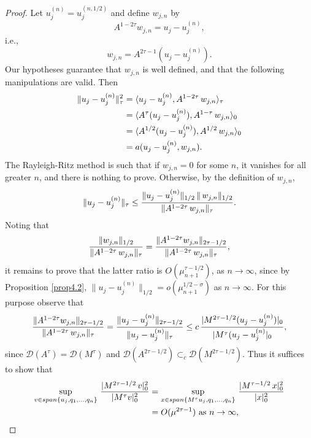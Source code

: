 \documentclass[final]{siamltex}
\numberwithin{equation}{section}
\begin{document}
\begin{proof}
Let $u_{j}^{(n)}= u_{j}^{(n,1/2)}$ and define $w_{j,n}$ by
\[A^{1-2 \tau} w_{j,n} = u_j - u_{j}^{(n)},\]
i.e.,
\[w_{j,n} = A^{2 \tau-1} \left(u_j - u_{j}^{(n)}\right).\]
Our hypotheses guarantee that $w_{j,n}$ is well defined, and that the following manipulations are valid. Then
\begin{align}
\|u_j-u_j^{(n)}\|_{\tau}^2 &= \langle u_j-u_j^{(n)} , A^{1-2 \tau} \, w_{j,n}\rangle_{\tau} \notag \\
&= \langle A^{\tau} (u_j-u_j^{(n)}) , A^{1-\tau} \, w_{j,n}\rangle_{0} \notag \\
&= \langle A^{1/2} (u_j-u_j^{(n)}) , A^{1/2} \, w_{j,n}\rangle_{0}\notag \\
&=a(u_j-u_j^{(n)}, w_{j,n}).\notag
\end{align}
The Rayleigh-Ritz method is such that if $w_{j,n}=0$ for some $n$, it vanishes for all greater $n$, and there is nothing to prove. Otherwise, by the definition of $w_{j,n}$,
\begin{equation} \notag
\|u_j-u_j^{(n)}\|_{\tau} \le \frac{\|u_j-u_j^{(n)}\|_{1/2}\, \|\, w_{j,n}\|_{1/2}}
{\|A^{1-2 \tau} \, w_{j,n}\|_{\tau}}.
\end{equation}
Noting that
\begin{equation} \notag
\frac{\|w_{j,n}\|_{1/2}}
{\|A^{1-2 \tau} \, w_{j,n}\|_{\tau}}= \frac{\|A^{1-2\tau} w_{j,n}\|_{2\tau-1/2}}
{\|A^{1-2 \tau} \, w_{j,n}\|_{\tau}},
\end{equation}
it remains to prove that the latter ratio is $O(\mu_{n+1}^{\tau-1/2})$, as $n\to \infty$, since by Proposition \ref{prop4.2}, $\|u_j-u_j^{(n)}\|_{1/2}=o(\mu_{n+1}^{1/2-\sigma})$ as $n\to \infty$.
For this purpose observe that
\begin{equation} \notag
\frac{\|A^{1-2\tau} w_{j,n}\|_{2\tau-1/2}}
{\|A^{1-2 \tau} \, w_{j,n}\|_{\tau}}=\frac{\|u_j-u_j^{(n)}\|_{2\tau-1/2}}{
\|u_j-u_j^{(n)}\|_{\tau}} \le c \,
\frac{|M^{2 \tau -1/2} (u_j-u_j^{(n)})|_{0}}{
|M^{\tau}(u_j-u_j^{(n)}|_{0}},
\end{equation}
since $\mathcal{D}(A^{\tau})=\mathcal{D}(M^{\tau})$ and $\mathcal{D}(A^{2\tau-1/2})\subset_{c} \mathcal{D}(M^{2\tau-1/2})$. Thus it suffices to show that
\begin{align}
\sup_{v \in span\{u_j, q_1, \ldots, q_{n}\}} \, \frac{|M^{2 \tau-1/2} \, v|_{0}^2}
{|M^{\tau} v|_{0}^2} &=\sup_{x \in span\{M^{\tau} u_j, q_1, \ldots, q_{n}\}} \, \frac{|M^{\tau-1/2} \, x|_{0}^2}
{|x|_{0}^2}\notag \\
&=O(\mu^{2 \tau-1}) \text{ as } n\to \infty, \notag

\end{align}
\end{proof}
\end{document}
